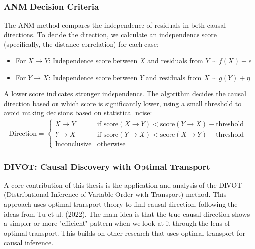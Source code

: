 \subsubsection{ANM Decision Criteria}

The ANM method compares the independence of residuals in both causal directions. To decide the direction, we calculate an independence score (specifically, the distance correlation) for each case:
\begin{itemize}
    \item For $X \rightarrow Y$: Independence score between $X$ and residuals from $Y \sim f(X) + \epsilon$
    \item For $Y \rightarrow X$: Independence score between $Y$ and residuals from $X \sim g(Y) + \eta$
\end{itemize}

A lower score indicates stronger independence. The algorithm decides the causal direction based on which score is significantly lower, using a small threshold to avoid making decisions based on statistical noise:
\begin{align}
\text{Direction} = \begin{cases}  
X \rightarrow Y & \text{if } \text{score}(X \rightarrow Y) < \text{score}(Y \rightarrow X) - \text{threshold} \\
Y \rightarrow X & \text{if } \text{score}(Y \rightarrow X) < \text{score}(X \rightarrow Y) - \text{threshold} \\
\text{Inconclusive} & \text{otherwise}
\end{cases}
\end{align}

\subsubsection{DIVOT: Causal Discovery with Optimal Transport}
A core contribution of this thesis is the application and analysis of the DIVOT (Distributional Inference of Variable Order with Transport) method. This approach uses optimal transport theory to find causal direction, following the ideas from Tu et al. (2022)\cite{Tu22}. The main idea is that the true causal direction shows a simpler or more "efficient" pattern when we look at it through the lens of optimal transport. This builds on other research that uses optimal transport for causal inference\cite{Charpentier23,Torous24}.

